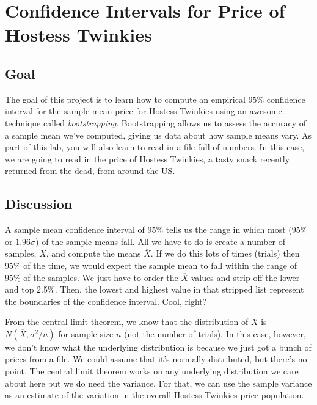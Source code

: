 \documentclass[titlepage]{tufte-book}
\newcounter{problem}
\begin{document}
\chapter{Confidence Intervals for Price of Hostess Twinkies}

\setcounter{problem}{1}
\section{Goal}

\begin{fullwidth}

The goal of this project is to learn how to compute an empirical 95\% confidence interval for the sample mean price for Hostess Twinkies using an awesome technique called {\em bootstrapping}. Bootstrapping allows us to assess the accuracy of a sample mean we've computed, giving us data about how sample means vary. As part of this lab, you will also learn to read in a file full of numbers. In this case, we are going to read in the price of Hostess Twinkies, a tasty snack recently returned from the dead, from around the US.

\section{Discussion}

A sample mean confidence interval of 95\% tells us the range in which most (95\% or $1.96\sigma$) of the sample means fall.  All we have to do is create a number of samples, $X$, and compute the means $\overline{X}$.  If we do this lots of times (trials) then 95\% of the time, we would expect the sample mean to fall within the range of 95\% of the samples. We just have to order the $\overline{X}$ values and strip off the lower and top 2.5\%. Then, the lowest and highest value in that stripped list represent the boundaries of the confidence interval. Cool, right?

From the central limit theorem, we know that the distribution of $\overline{X}$ is $N(\overline{X}, \sigma^2/n)$ for sample size $n$ (not the number of trials). In this case, however, we don't know what the underlying distribution is because we just got a bunch of prices from a file. We could assume that it's normally distributed, but there's no point. The central limit theorem works on any underlying distribution we care about here but we do need the variance. For that, we can use the sample variance as an estimate of the variation in the overall Hostess Twinkies price population.  


\end{fullwidth}
\end{document}
